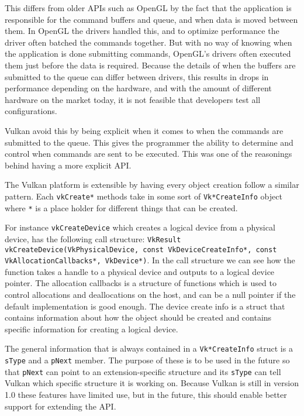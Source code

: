 This differs from older \glspl{API} such as OpenGL by the fact that the application is responsible for the command buffers and queue, and when data is moved between them.
In OpenGL the drivers handled this, and to optimize performance the driver often batched the commands together.
But with no way of knowing when the application is done submitting commands, OpenGL's drivers often executed them just before the data is required.
Because the details of when the buffers are submitted to the queue can differ between drivers, this results in drops in performance depending on the hardware, and with the amount of different hardware on the market today, it is not feasible that developers test all configurations.

Vulkan avoid this by being explicit when it comes to when the commands are submitted to the queue.
This gives the programmer the ability to determine and control when commands are sent to be executed.
This was one of the reasonings behind having a more explicit \gls{API}.

The Vulkan platform is extensible by having every object creation follow a similar pattern.
Each \texttt{vkCreate*} methods take in some sort of \texttt{Vk*Create\-Info} object where \texttt{*} is a place holder for different things that can be created.

For instance \texttt{vkCreateDevice} which creates a logical device from a physical device, has the following call structure: \texttt{VkResult vkCreateDevice(VkPhysicalDevice, const VkDeviceCreateInfo*, const VkAllocationCallbacks*, VkDevice*)}.
In the call structure we can see how the function takes a handle to a physical device and outputs to a logical device pointer.
The allocation callbacks is a structure of functions which is used to control allocations and deallocations on the host, and can be a null pointer if the default implementation is good enough.
The device create info is a struct that contains information about how the object should be created and contains specific information for creating a logical device.

The general information that is always contained in a \texttt{Vk*CreateInfo} struct is a \texttt{sType} and a \texttt{pNext} member.
The purpose of these is to be used in the future so that \texttt{pNext} can point to an extension-specific structure and its \texttt{sType} can tell Vulkan which specific structure it is working on.
Because Vulkan is still in version 1.0 these features have limited use, but in the future, this should enable better support for extending the \gls{API}.

